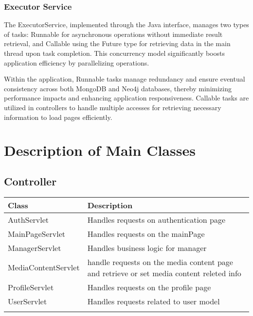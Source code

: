 \subsubsection*{Executor Service}

The ExecutorService, implemented through the Java interface, manages two types of tasks: Runnable for asynchronous operations 
without immediate result retrieval, and Callable using the Future type for retrieving data in the main thread upon task completion. 
This concurrency model significantly boosts application efficiency by parallelizing operations.

\vspace{\baselineskip}

Within the application, Runnable tasks manage redundancy and ensure eventual consistency across both MongoDB and 
Neo4j databases, thereby minimizing performance impacts and enhancing application responsiveness. Callable tasks 
are utilized in controllers to handle multiple accesses for retrieving necessary information to load pages efficiently.

\newpage

\section{Description of Main Classes}

\subsection*{Controller}
\renewcommand{\arraystretch}{1.5}
\begin{longtable}{|>{\arraybackslash}m{0.3\linewidth}|>{\arraybackslash}m{0.73\linewidth}|}
    \cline{1-2}
    \textbf{Class} & \textbf{Description} \\
    \cline{1-2}
    AuthServlet & Handles requests on authentication page \\
    \cline{1-2}
    MainPageServlet & Handles requests on the mainPage \\
    \cline{1-2}
    ManagerServlet & Handles business logic for manager \\    
    \cline{1-2}
    MediaContentServlet & handle requests on the media content page and retrieve or set media content releted info \\
    \cline{1-2}
    ProfileServlet & Handles requests on the profile page \\
    \cline{1-2}
    UserServlet & Handles requests related to user model \\
    \cline{1-2}
\end{longtable}

